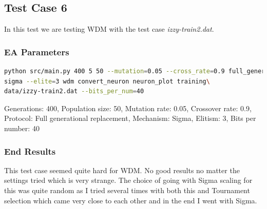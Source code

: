 \subsection{Test Case 6}\label{sec:test-case-6}
In this test we are testing WDM with the test case
\textit{izzy-train2.dat}.
\subsubsection{EA Parameters}\label{sec:test-case-6-parameters}
\begin{lstlisting}[frame=single, language=bash, caption=Command-line to
replicate the results]
python src/main.py 400 5 50 --mutation=0.05 --cross_rate=0.9 full_generational
sigma --elite=3 wdm convert_neuron neuron_plot training\
data/izzy-train2.dat --bits_per_num=40
\end{lstlisting}
Generations: 400, Population size: 50, Mutation rate: 0.05, Crossover rate: 0.9, Protocol: Full generational replacement, Mechanism: Sigma, Elitism: 3, Bits per number: 40
\subsubsection{End Results}\label{sec:test-case-6-results}
This test case seemed quite hard for WDM. No good results no matter the settings
tried which is very strange. The choice of going with Sigma scaling for this was
quite random as I tried several times with both this and Tournament selection
which came very close to each other and in the end I went with Sigma.

